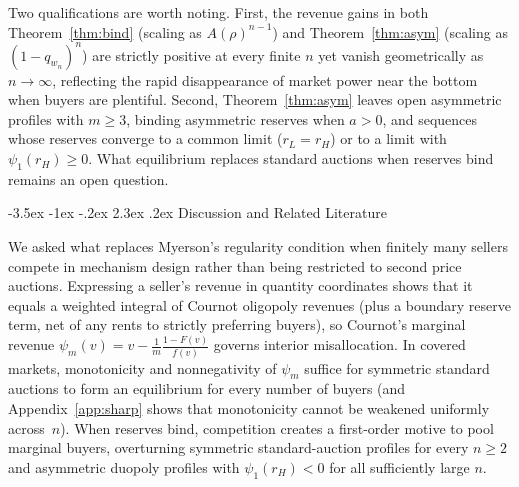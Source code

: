 \documentclass[12pt]{article}
\makeatletter
\theoremstyle{mystyle}
\theoremstyle{mystyle2}
\newcommand{\mmpfont}{\scshape}
\renewcommand\section{\@startsection {section}{1}{\z@}%
                                   {-3.5ex \@plus -1ex \@minus -.2ex}%
                                   {2.3ex \@plus .2ex}%
                                   {\normalfont\large\mmpfont}}
\newcommand{\1}{\mathbf{1}}
\makeatother
\begin{document}
Two qualifications are worth noting. First, the revenue gains in both Theorem~\ref{thm:bind} (scaling as $A(\rho)^{n-1}$) and Theorem~\ref{thm:asym} (scaling as $(1-q_{w_n})^n$) are strictly positive at every finite $n$ yet vanish geometrically as $n\to\infty$, reflecting the rapid disappearance of market power near the bottom when buyers are plentiful. Second, Theorem~\ref{thm:asym} leaves open asymmetric profiles with $m\ge 3$, binding asymmetric reserves when $a>0$, and sequences whose reserves converge to a common limit ($r_L=r_H$) or to a limit with $\psi_1(r_H)\ge 0$. What equilibrium replaces standard auctions when reserves bind remains an open question.

\section{Discussion and Related Literature} \label{sec:discuss}

We asked what replaces Myerson's regularity condition when finitely many sellers compete in mechanism design rather than being restricted to second price auctions. Expressing a seller's revenue in quantity coordinates shows that it equals a weighted integral of Cournot oligopoly revenues (plus a boundary reserve term, net of any rents to strictly preferring buyers), so Cournot's marginal revenue $\psi_m(v)=v-\frac{1}{m}\frac{1-F(v)}{f(v)}$ governs interior misallocation. In covered markets, monotonicity and nonnegativity of $\psi_m$ suffice for symmetric standard auctions to form an equilibrium for every number of buyers (and Appendix~\ref{app:sharp} shows that monotonicity cannot be weakened uniformly across~$n$). When reserves bind, competition creates a first-order motive to pool marginal buyers, overturning symmetric standard-auction profiles for every $n\ge 2$ and asymmetric duopoly profiles with $\psi_1(r_H)<0$ for all sufficiently large $n$.
\end{document}
